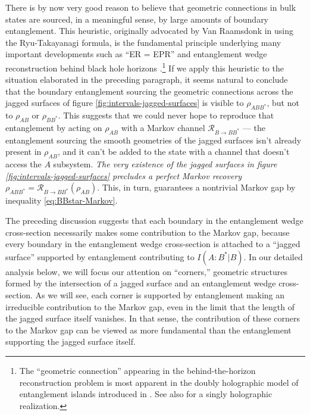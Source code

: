 \documentclass[a4paper,11pt]{article}
\begin{document}
There is by now very good reason to believe that geometric connections in bulk states are sourced, in a meaningful sense, by large amounts of boundary entanglement. This heuristic, originally advocated by Van Raamsdonk in \cite{van2010building} using the Ryu-Takayanagi formula, is the fundamental principle underlying many important developments such as ``ER = EPR'' \cite{maldacena2013cool} and entanglement wedge reconstruction behind black hole horizons \cite{islands1, islands2, RWW}.\footnote{The ``geometric connection'' appearing in the behind-the-horizon reconstruction problem is most apparent in the doubly holographic model of entanglement islands introduced in \cite{AMMZ}. See also \cite{Anderson:2021vof} for a singly holographic realization.} If we apply this heuristic to the situation elaborated in the preceding paragraph, it seems natural to conclude that the boundary entanglement sourcing the geometric connections across the jagged surfaces of figure \ref{fig:intervals-jagged-surfaces} is visible to $\rho_{ABB^*}$, but not to $\rho_{AB}$ or $\rho_{BB^*}$. This suggests that we could never hope to reproduce that entanglement by acting on $\rho_{AB}$ with a Markov channel $\mathcal{R}_{B \rightarrow BB^*}$ --- the entanglement sourcing the smooth geometries of the jagged surfaces isn't already present in $\rho_{AB}$, and it can't be added to the state with a channel that doesn't access the $A$ subsystem. \textit{The very existence of the jagged surfaces in figure \ref{fig:intervals-jagged-surfaces} precludes a perfect Markov recovery $\rho_{ABB^*} = \mathcal{R}_{B \rightarrow BB^*}(\rho_{AB}).$} This, in turn, guarantees a nontrivial Markov gap by inequality \eqref{eq:BBstar-Markov}.


The preceding discussion suggests that each boundary in the entanglement wedge cross-section necessarily makes some contribution to the Markov gap, because every boundary in the entanglement wedge cross-section is attached to a ``jagged surface'' supported by entanglement contributing to $I(A:B^*|B)$. In our detailed analysis below, we will focus our attention on ``corners,'' geometric structures formed by the intersection of a jagged surface and an entanglement wedge cross-section. As we will see, each corner is supported by entanglement making an irreducible contribution to the Markov gap, even in the limit that the length of the jagged surface itself vanishes. In that sense, the contribution of these corners to the Markov gap can be viewed as more fundamental than the entanglement supporting the jagged surface itself.
\end{document}
